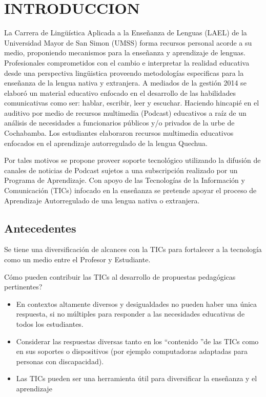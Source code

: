 \chapter{INTRODUCCION}

La Carrera de Ling\"{u}\'{i}stica Aplicada a la Ense\~{n}anza de Lenguas (LAEL)
de la Universidad Mayor de San Simon (UMSS) forma recursos  personal acorde a 
su medio, proponiendo mecanismos para la ense\~{n}anza y aprendizaje de lenguas.
Profesionales comprometidos con el cambio e interpretar la realidad educativa
desde una perspectiva ling\"{u}istica proveendo metodolog\'{i}as especificas
para la ense\~{n}anza de la lengua nativa y extranjera. A mediados de la 
gesti\'{o}n 2014 se elabor\'{o} un material educativo enfocado en el desarrollo
de las habilidades comunicativas como ser: hablar, escribir, leer y escuchar.
Haciendo hincapi\'{e} en el auditivo por medio de recursos multimedia (Podcast) 
educativos a ra\'{i}z de un an\'{a}lisis de necesidades a funcionarios p\'{u}blicos
y/o privados de la urbe de Cochabamba. Los estudiantes elaboraron recursos 
multimedia educativos enfocados en el aprendizaje autorregulado de la lengua Quechua.

Por tales motivos se propone proveer soporte tecnol\'{o}gico utilizando la 
difusi\'{o}n de canales de noticias de Podcast sujetos a una subscripci\'{o}n
realizado por un Programa de Aprendizaje. Con apoyo de las Tecnolog\'{i}as de la
Informaci\'{o}n y Comunicaci\'{o}n (TICs) infocado en la ense\~{n}anza se pretende
apoyar el proceso de Aprendizaje Autorregulado de una lengua nativa o extranjera.

\section{Antecedentes}

Se tiene una diversificaci\'{o}n de alcances con la TICs para fortalecer a la 
tecnolog\'{i}a como un medio entre el Profesor y Estudiante.

\textquestiondown C\'{o}mo pueden contribuir las TICs al desarrollo de propuestas
pedag\'{o}gicas pertinentes? \cite{severin2013enfoques}


\begin{itemize}

\item En contextos altamente diversos y desigualdades no pueden haber una 
\'{u}nica respuesta, si no m\'{u}ltiples para responder a las necesidades 
educativas de todos los estudiantes.
\item Considerar las respuestas diversas tanto en los \textquotedblleft contenido
\textquotedblright  de las TICs como en sus soportes o dispositivos (por ejemplo
computadoras adaptadas para personas con discapacidad).
\item Las TICs pueden ser una herramienta \'{u}til para diversificar la 
ense\~{n}anza y el aprendizaje

\end{itemize}


